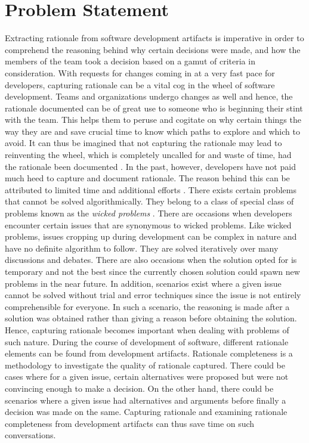 \documentclass[a4paper,12pt,twoside]{report}
\begin{document}
\section{Problem Statement}
Extracting rationale from software development artifacts is imperative in order to comprehend the reasoning behind why certain decisions were made, and how the members of the team took a decision based on a gamut of criteria in consideration. With requests for changes coming in at a very fast pace for developers, capturing rationale can be a vital cog in the wheel of software development. Teams and organizations undergo changes as well and hence, the rationale documented can be of great use to someone who is beginning their stint with the team. This helps them to peruse and cogitate on why certain things the way they are and save crucial time to know which paths to explore and which to avoid. It can thus be imagined that not capturing the rationale may lead to reinventing the wheel, which is completely uncalled for and waste of time, had the rationale been documented \cite{Bruegge2009}. In the past, however, developers have not paid much heed to capture and document rationale. The reason behind this can be attributed to limited time and additional efforts \cite{Dutoit2006}. 
\newline \newline
There exists certain problems that cannot be solved algorithmically. They belong to a class of special class of problems known as the \textit{wicked problems} \cite{Rittel1973}. There are occasions when developers encounter certain issues that are synonymous to wicked problems. Like wicked problems, issues cropping up during development can be complex in nature and have no definite algorithm to follow. They are solved iteratively over many discussions and debates. There are also occasions when the solution opted for is temporary and not the best since the currently chosen solution could spawn new problems in the near future. In addition, scenarios exist where a given issue cannot be solved without trial and error techniques since the issue is not entirely comprehensible for everyone. In such a scenario, the reasoning is made after a solution was obtained rather than giving a reason before obtaining the solution. Hence, capturing rationale becomes important when dealing with problems of such nature. 
\newline \newline
During the course of development of software, different rationale elements can be found from development artifacts. Rationale completeness is a methodology to investigate the quality of rationale captured. There could be cases where for a given issue, certain alternatives were proposed but were not convincing enough to make a decision. On the other hand, there could be scenarios where a given issue had alternatives and arguments before finally a decision was made on the same. Capturing rationale and examining rationale completeness from development artifacts can thus save time on such conversations. 
\end{document}
